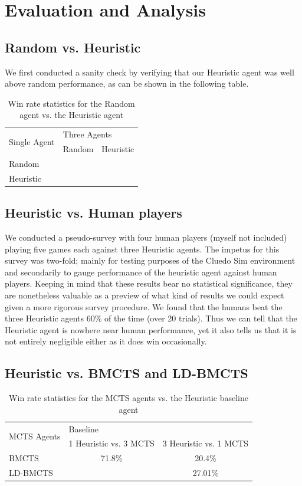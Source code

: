 \documentclass[msc, deptreport, ai, romanprepages]{infthesis}
\begin{document}
\chapter{Evaluation and Analysis}
\section{Random vs. Heuristic}
We first conducted a sanity check by verifying that our Heuristic agent was well above random performance, as can be shown in the following table.
\begin{table}[h]
\centering
\caption{Win rate statistics for the Random agent vs. the Heuristic agent}
\begin{tabular}{l|llll}
\multirow{2}{*}{Single Agent} & \multicolumn{4}{l}{Three Agents} \\ \cline{2-5} 
& \multicolumn{2}{l|}{Random} & \multicolumn{2}{l}{Heuristic} \\ \hline \hline
Random & \multicolumn{2}{c}{} & \multicolumn{2}{c}{} \\
Heuristic & \multicolumn{2}{c}{} & \multicolumn{2}{c}{} 
\end{tabular}
\end{table}

\section{Heuristic vs. Human players}

We conducted a pseudo-survey with four human players (myself not included) playing five games each against three Heuristic agents. The impetus for this survey was two-fold; mainly for testing purposes of the Cluedo Sim environment and secondarily to gauge performance of the heuristic agent against human players. Keeping in mind that these results bear no statistical significance, they are nonetheless valuable as a preview of what kind of results we could expect given a more rigorous survey procedure. We found that the humans beat the three Heuristic agents 60\% of the time (over 20 trials). Thus we can tell that the Heuristic agent is nowhere near human performance, yet it also tells us that it is not entirely negligible either as it does win occasionally.

\section{Heuristic vs. BMCTS and LD-BMCTS}

\begin{table}[h]
\centering
\caption{Win rate statistics for the MCTS agents vs. the Heuristic baseline agent}
\begin{tabular}{l|llll}
\multirow{2}{*}{MCTS Agents} & \multicolumn{4}{l}{Baseline} \\ \cline{2-5} 
& \multicolumn{2}{l|}{1 Heuristic vs. 3 MCTS} & \multicolumn{2}{l}{3 Heuristic vs. 1 MCTS} \\ \hline \hline
BMCTS & \multicolumn{2}{c}{71.8\%} & \multicolumn{2}{c}{20.4\%} \\
LD-BMCTS & \multicolumn{2}{c}{} & \multicolumn{2}{c}{27.01\%} 
\end{tabular}
\end{table}
\end{document}
